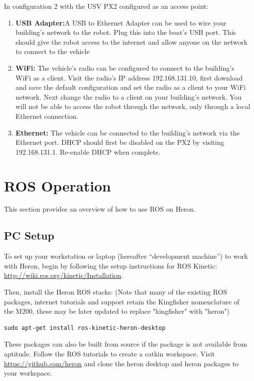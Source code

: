 \documentclass[]{clearpath-latex/clearpath-manual}
\begin{document}
In configuration 2 with the USV PX2 configured as an access point:

\begin{enumerate}
\item \textbf{USB Adapter:}A USB to Ethernet Adapter can be used to wire your building's network to the robot. Plug this into the boat's USB port. This should give the robot access to the internet and allow anyone on the network to connect to the vehicle
\item \textbf{WiFi:} The vehicle's radio can be configured to connect to the building's WiFi as a client. Visit the radio's IP address 192.168.131.10, first download and save the default configuration and set the radio as a client to your WiFi network. Next change the radio to a client on your building's network. You will not be able to access the robot through the network, only through a local Ethernet connection.
\item \textbf{Ethernet:} The vehicle can be connected to the building's network via the Ethernet port. DHCP should first be disabled on the PX2 by visiting 192.168.131.1. Re-enable DHCP when complete.
\end{enumerate}



\newpage

\section{ROS Operation}
This section provides an overview of how to use ROS on Heron.

\subsection{PC Setup} \label{pcsetup}

To set up your workstation or laptop (hereafter “development machine”) to work with Heron, begin by following the setup instructions for ROS Kinetic: \url{http://wiki.ros.org/kinetic/Installation}.

Then, install the Heron ROS stacks:
(Note that many of the existing ROS packages, internet tutorials and support retain the Kingfisher nomenclature of the M200, these may be later updated to replace "kingfisher" with "heron")

\begin{lstlisting}
sudo apt-get install ros-kinetic-heron-desktop
\end{lstlisting}

These packages can also be built from source if the package is not available from aptitude. Follow the ROS tutorials to create a catkin workspace. Visit \url{https://github.com/heron} and clone the heron desktop and heron packages to your workspace.
\end{document}
